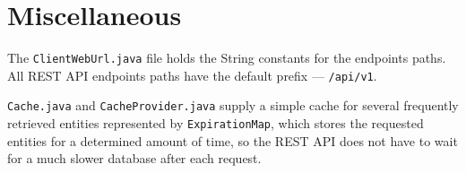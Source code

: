 \section{Miscellaneous}
The \texttt{ClientWebUrl.java} file holds the String constants for the endpoints paths. All REST API endpoints paths have the default prefix --- \texttt{/api/v1}.

\texttt{Cache.java} and \texttt{CacheProvider.java} supply a simple cache for several frequently retrieved entities represented by \texttt{ExpirationMap}, which stores the requested entities for a determined amount of time, so the REST API does not have to wait for a much slower database after each request.
